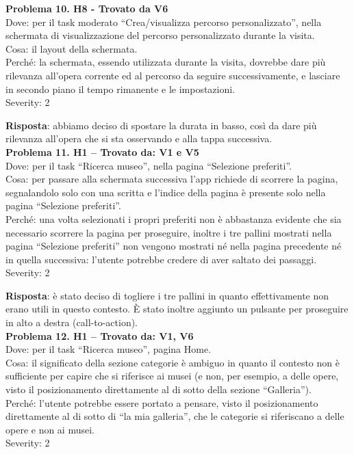 \documentclass{article}
\begin{document}
\noindent \textbf{Problema 10. H8 - Trovato da V6} \\
Dove: per il task moderato “Crea/visualizza percorso personalizzato”, nella schermata di visualizzazione del percorso personalizzato durante la visita. \\
Cosa: il layout della schermata. \\
Perché: la schermata, essendo utilizzata durante la visita, dovrebbe dare più rilevanza all’opera corrente ed al percorso da seguire successivamente, e lasciare in secondo piano il tempo rimanente e le impostazioni. \\
Severity: 2

\noindent \textbf{Risposta}: abbiamo deciso di spostare la durata in basso, così da dare più rilevanza all’opera che si sta osservando e alla tappa successiva.\\

\noindent \textbf{Problema 11. H1 – Trovato da: V1 e V5} \\
Dove: per il task “Ricerca museo”, nella pagina “Selezione preferiti”. \\
Cosa: per passare alla schermata successiva l’app richiede di scorrere la pagina, segnalandolo solo con una scritta e l’indice della pagina è presente solo nella pagina “Selezione preferiti”. \\
Perché: una volta selezionati i propri preferiti non è abbastanza evidente che sia necessario scorrere la pagina per proseguire, inoltre i tre pallini mostrati nella pagina “Selezione preferiti” non vengono mostrati né nella pagina precedente né in quella successiva: l’utente potrebbe credere di aver saltato dei passaggi. \\
Severity: 2

\noindent \textbf{Risposta}: è stato deciso di togliere i tre pallini in quanto effettivamente non erano utili in questo contesto. È stato inoltre aggiunto un pulsante per proseguire in alto a destra (call-to-action).\\

\noindent \textbf{Problema 12. H1 – Trovato da: V1, V6} \\
Dove: per il task “Ricerca museo”, pagina Home. \\
Cosa: il significato della sezione categorie è ambiguo in quanto il contesto non è sufficiente per capire che si riferisce ai musei (e non, per esempio, a delle opere, visto il posizionamento direttamente al di sotto della sezione “Galleria”). \\
Perché: l’utente potrebbe essere portato a pensare, visto il posizionamento direttamente al di sotto di “la mia galleria”, che le categorie si riferiscano a delle opere e non ai musei. \\
Severity: 2
\end{document}
